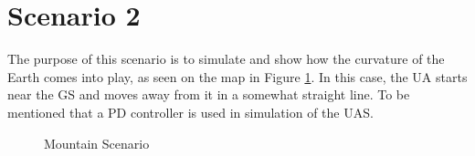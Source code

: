 \section{Scenario 2}\label{sec:scenario2}
The purpose of this scenario is to simulate and show how the curvature of the Earth comes into play, as seen on the map in Figure \ref{fig:s2_map}. In this case, the UA starts near the GS and moves away from it in a somewhat straight line. To be mentioned that a PD controller is used in simulation of the UAS.

\begin{figure}[H]
	\hfill
	\hfill
	\hfill
	\caption{Mountain Scenario}
	\label{fig:s2_map}
\end{figure}

